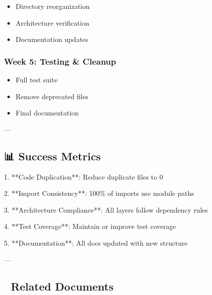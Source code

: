 \documentclass[11pt,a4paper]{article}
\begin{document}
\begin{itemize}
\item Directory reorganization
\end{itemize}

\begin{itemize}
\item Architecture verification
\end{itemize}

\begin{itemize}
\item Documentation updates
\end{itemize}

\subsubsection{Week 5: Testing & Cleanup}

\begin{itemize}
\item Full test suite
\end{itemize}

\begin{itemize}
\item Remove deprecated files
\end{itemize}

\begin{itemize}
\item Final documentation
\end{itemize}

---

\subsection{📊 Success Metrics}

1. **Code Duplication**: Reduce duplicate files to 0

2. **Import Consistency**: 100\% of imports use module paths

3. **Architecture Compliance**: All layers follow dependency rules

4. **Test Coverage**: Maintain or improve test coverage

5. **Documentation**: All docs updated with new structure

---

\subsection{🔗 Related Documents}
\end{document}
